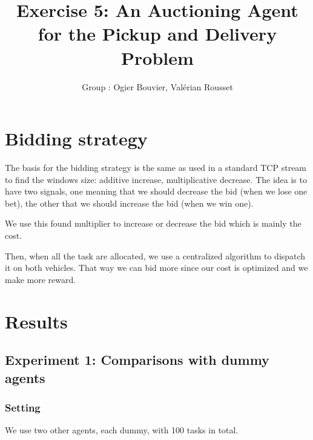 \documentclass[11pt]{article}
\title{\bf Exercise 5: An Auctioning Agent for the Pickup and Delivery Problem}
\author{Group \textnumero 17: Ogier Bouvier, Valérian Rousset}
\begin{document}
\maketitle

\section{Bidding strategy}
The basis for the bidding strategy is the same as used in a standard TCP stream
to find the windows size: additive increase, multiplicative decrease. The idea
is to have two signals, one meaning that we should decrease the bid (when we
lose one bet), the other that we should increase the bid (when we win one).

We use this found multiplier to increase or decrease the bid which is mainly the
cost.

Then, when all the task are allocated, we use a centralized algorithm to
dispatch it on both vehicles. That way we can bid more since our cost is
optimized and we make more reward.

\section{Results}

\subsection{Experiment 1: Comparisons with dummy agents}

\subsubsection{Setting}
We use two other agents, each dummy, with 100 tasks in total.
\end{document}
